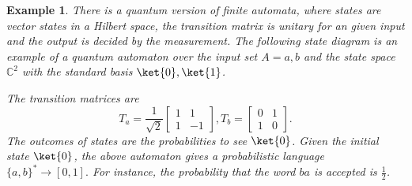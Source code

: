 \documentclass[a4paper, 11pt]{article}
\newtheorem{example}{Example}
\newcommand{\roothalf}{\frac{1}{\sqrt{2}}}
\newcommand{\half}{\frac{1}{2}}
\begin{document}
\begin{example}
 \label{QA}
 There is a quantum version of finite automata, where states are vector states in a Hilbert space, the transition matrix is unitary for an given input and the output is decided by the measurement. The following state diagram is an example of a quantum automaton over the input set $A={a,b}$ and the state space $\mathbb{C}^2$ with the standard basis $\ket{0},\ket{1}$. 
\begin{center}
\end{center} 
The transition matrices are
$$
T_a=\roothalf\begin{bmatrix}
1&1 \\
1&-1
\end{bmatrix}, 
T_b=\begin{bmatrix}
0&1\\
1&0
\end{bmatrix}.
$$
The outcomes of states are the probabilities to see $\ket{0}$. Given the initial state $\ket{0}$, the above automaton gives a probabilistic language $\{a,b\}^*\rightarrow[0,1].$ For instance, the probability that the word $ba$ is accepted  is $\half$. 
\end{example}
\end{document}
